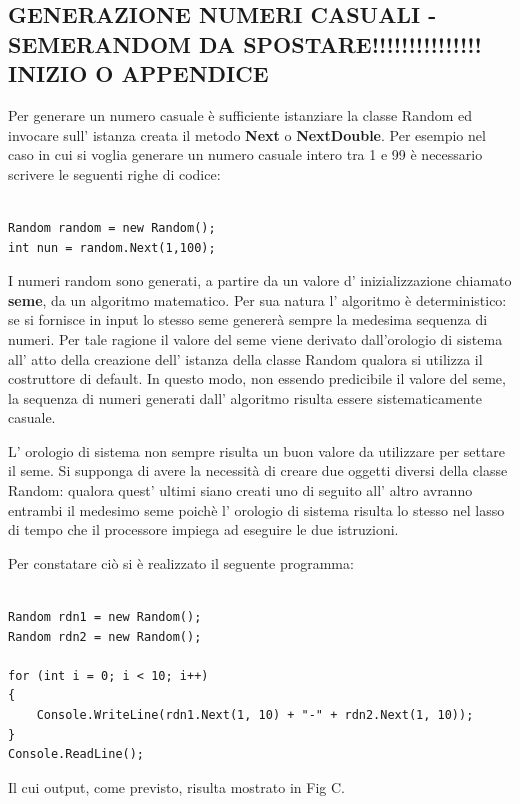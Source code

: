 \documentclass[11pt]{article}
\begin{document}
\subsection*{GENERAZIONE NUMERI CASUALI - SEMERANDOM DA SPOSTARE!!!!!!!!!!!!!!! INIZIO O APPENDICE}

Per generare un numero casuale è sufficiente istanziare la classe Random ed invocare sull' istanza creata il metodo \textbf{Next} o \textbf{NextDouble}. Per esempio nel caso in cui si voglia generare un numero casuale intero tra 1 e 99 è necessario scrivere le seguenti righe di codice:

\begin{lstlisting}

Random random = new Random();
int nun = random.Next(1,100);

\end{lstlisting}

I numeri random sono generati, a partire da un valore d' inizializzazione chiamato \textbf{seme}, da un algoritmo matematico. Per sua natura l' algoritmo è deterministico: se si fornisce in input lo stesso seme genererà sempre la medesima sequenza di numeri. Per tale ragione il valore del seme viene derivato dall'orologio di sistema all' atto della  creazione dell' istanza della classe Random qualora si utilizza il costruttore di default. In questo modo, non essendo predicibile il valore del seme, la sequenza di numeri generati dall' algoritmo risulta essere sistematicamente casuale. 

L' orologio di sistema non sempre risulta un buon valore da utilizzare per settare il seme. Si supponga di avere la necessità di creare due oggetti diversi della classe Random: qualora quest’ ultimi siano creati uno di seguito all’ altro avranno entrambi il medesimo seme poichè l' orologio di sistema risulta lo stesso nel lasso di tempo che il processore impiega ad eseguire le due istruzioni.

Per constatare ciò si è realizzato il seguente programma:

\begin{lstlisting}

Random rdn1 = new Random();
Random rdn2 = new Random();

for (int i = 0; i < 10; i++)
{
    Console.WriteLine(rdn1.Next(1, 10) + "-" + rdn2.Next(1, 10));
}
Console.ReadLine();

\end{lstlisting}

Il cui output, come previsto, risulta mostrato in Fig C.
\end{document}
